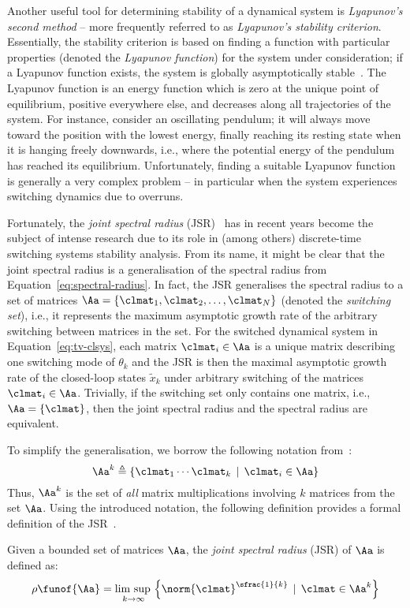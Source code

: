Another useful tool for determining stability of a dynamical system is \emph{Lyapunov's second method} -- more frequently referred to as \emph{Lyapunov's stability criterion}.
Essentially, the stability criterion is based on finding a function with particular properties (denoted the \emph{Lyapunov function}) for the system under consideration; if a Lyapunov function exists, the system is globally asymptotically stable~\cite{Astrom:1997}.
The Lyapunov function is an energy function which is zero at the unique point of equilibrium, positive everywhere else, and decreases along all trajectories of the system.
For instance, consider an oscillating pendulum; it will always move toward the position with the lowest energy, finally reaching its resting state when it is hanging freely downwards, i.e., where the potential energy of the pendulum has reached its equilibrium.
Unfortunately, finding a suitable Lyapunov function is generally a very complex problem -- in particular when the system experiences switching dynamics due to overruns.

Fortunately, the \emph{joint spectral radius} (JSR)~\cite{Rota:1960} has in recent years become the subject of intense research due to its role in (among others) discrete-time switching systems stability analysis.
From its name, it might be clear that the joint spectral radius is a generalisation of the spectral radius from Equation~\eqref{eq:spectral-radius}.
In fact, the JSR generalises the spectral radius to a set of matrices $\Aa = \left\{ \clmat_1, \clmat_2, \ldots, \clmat_N \right\}$ (denoted the \emph{switching set}), i.e., it represents the maximum asymptotic growth rate of the arbitrary switching between matrices in the set.
For the switched dynamical system in Equation~\eqref{eq:tv-clsys}, each matrix $\clmat_i \in \Aa$ is a unique matrix describing one switching mode of $\theta_k$ and the JSR is then the maximal asymptotic growth rate of the closed-loop states $\tilde{x}_k$ under arbitrary switching of the matrices $\clmat_i \in \Aa$.
Trivially, if the switching set only contains one matrix, i.e., $\Aa = \left\{ \clmat \right\}$, then the joint spectral radius and the spectral radius are equivalent.

To simplify the generalisation, we borrow the following notation from~\cite{Jungers:2009}:
%
\begin{equation*}
    \Aa^k \triangleq \left\{ \clmat_1 \cdots \clmat_k \,\mid\, \clmat_i \in \Aa \right\}
\end{equation*}
%
Thus, $\Aa^k$ is the set of \emph{all} matrix multiplications involving $k$ matrices from the set $\Aa$.
Using the introduced notation, the following definition provides a formal definition of the JSR~\cite{Jungers:2009}.
%
\begin{definition}%
    \label{def:jsr}%
    Given a bounded set of matrices $\Aa$, the \emph{joint spectral radius} (JSR) of $\Aa$ is defined as:
    \begin{equation*}
        \rho\funof{\Aa} = \underset{k\rightarrow\infty}{\lim{}\sup{}} \left\{ \norm{\clmat}^{\sfrac{1}{k}} \,\mid\, \clmat \in \Aa^k \right\}
    \end{equation*}
\end{definition}

